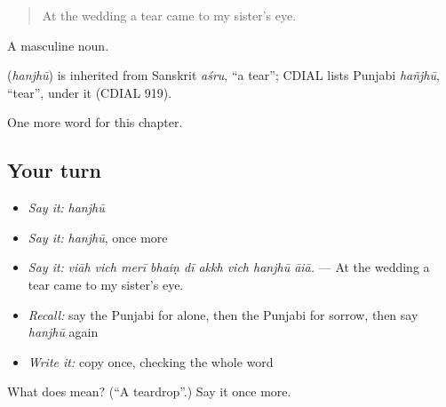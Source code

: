 \begin{quote}
At the wedding a tear came to my sister's eye.
\end{quote}

A masculine noun.

\begin{cousinweb}
\textbf{} (\emph{hanjhū}) is inherited from Sanskrit \emph{aśru}, \textquotedblleft{}a tear\textquotedblright{}; CDIAL lists Punjabi \emph{hañjhū}, \textquotedblleft{}tear\textquotedblright{}, under it (CDIAL 919).
\end{cousinweb}

\begin{grammarlens}[title={What you've built}]
One more word for this chapter.
\end{grammarlens}

\subsection*{Your turn}
\begin{itemize}
\raggedright
  \item \emph{Say it:} \emph{hanjhū}
  \item \emph{Say it:} \emph{hanjhū}, once more
  \item \emph{Say it:} \emph{viāh vich merī bhaiṇ dī akkh vich hanjhū āiā.} — At the wedding a tear came to my sister's eye.
  \item \emph{Recall:} say the Punjabi for alone, then the Punjabi for sorrow, then say \emph{hanjhū} again
  \item \emph{Write it:} copy \textbf{} once, checking the whole word
\end{itemize}

\begin{tcolorbox}[breakable,colback=teal!4,colframe=teal!35!black,title={Before you move on}]
What does  mean? (\textquotedblleft{}A teardrop\textquotedblright{}.) Say it once more.
\end{tcolorbox}
